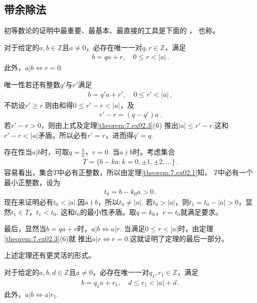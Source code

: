 \subsection*{带余除法}
初等数论的证明中最重要、最基本、最直接的工具是下面的
，
也称。
\begin{theorem}\label{theorem:7.ex02.4}
    对于给定的$a,b\in\mathbb{Z}$且$a\neq0$，必存在唯一一对$q,r\in\mathbb{Z}$，满足
    \begin{align}\label{eq:7.ex02.EuclideanDivision}
        b=qa+r,\quad 0\le r<|a|\, .
    \end{align}
    此外，$a|b \Leftrightarrow r=0$.
\end{theorem}
\begin{prove}
    {\sffamily 唯一性}\quad 若还有整数$q'$与$r'$满足
    \begin{align}\label{eq:7.ex02.prove-theorem4-01}
        b=q'a+r',\quad 0\le r'<|a|\, ,
    \end{align}
    不妨设$r'\ge r$.则由和得$0\le r'-r<|a|$，及
    \begin{align}
        r'-r=(q-q')a\, .
    \end{align}
    若$r'-r>0$，则由上式及定理\ref{theorem:7.ex02.3}(6)
    推出$|a|\le r'-r$.这和$r'-r<|a|$矛盾。所以必有$r'=r$，进而得$q'=q$.

        {\sffamily 存在性}\quad 当$a|b$时，可取$q=\displaystyle\frac{b}{a}$，$r=0$.
    当$a\nmid b$时。考虑集合
    \begin{align}
        T=\{b-ka:k=0,\pm1,\pm2,\ldots\}\, .
    \end{align}
    容易看出，集合$T$中必有正整数，所以由定理\ref{theorem:7.ex02.1}知，
    $T$中必有一个最小正整数，设为
    \begin{align}
        t_0=b-k_0a>0\, .
    \end{align}
    现在来证明必有$t_0<|a|$.因$a\nmid b$，所以$t_0\neq |a|$.
    若$t_0>|a|$，则$t_1=t_0-|a|>0$，显然$t_1\in T$，$t_1<t_0$.
    这和$t_0$的最小性矛盾。取$q=k_0$，$r=t_0$就满足要求。

    最后，显然当$b=qa+r$时，$a|b \Leftrightarrow a|r$.
    当满足$0\le r<|a|$时，由定理\ref{theorem:7.ex02.3}(6)就
    推出$a|r \Leftrightarrow r=0$.这就证明了定理的最后一部分。
\end{prove}

上述定理还有更灵活的形式。
\begin{theorem}\label{theorem:7.ex02.5}
    对于给定的$a,b,d\in\mathbb{Z}$且$a\neq0$，必存在唯一一对$q_1,r_1\in\mathbb{Z}$，满足
    \begin{align}\label{eq:7.7.ex02.remainder}
        b=q_1a+r_1,\quad d\le r_1<|a|+d\, .
    \end{align}
    此外，$a|b \Leftrightarrow a|r_1$.
\end{theorem}

